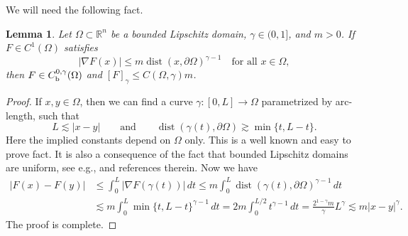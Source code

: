 \documentclass[intlimits,12pt,reqno]{amsart}
\newcommand{\R}{\mathbb R}
\numberwithin{equation}{section}
\def\dist{\operatorname{dist}}
\newtheorem{lemma}[theorem]{Lemma}
\theoremstyle{definition}
\begin{document}
We will need the following fact.
\begin{lemma}
\label{T81}
Let $\Omega\subset\R^n$ be a bounded Lipschitz domain, $\gamma\in (0,1]$, and $m>0$. If $F\in C^1(\Omega)$ satisfies 
$$
|\nabla F(x)|\leq m\dist (x,\partial\Omega)^{\gamma-1}
\quad
\text{for all }
x\in\Omega,
$$
then $F\in C_{\rm b}^{0,\gamma}(\Omega)$ and $[F]_{\gamma}\leq C(\Omega,\gamma)m$.
\end{lemma}
\begin{proof}
If $x,y\in\Omega$, then we can find a curve $\gamma:[0,L]\to\Omega$ parametrized by arc-length, such that
$$
L\lesssim |x-y|
\qquad
\text{and}
\qquad
\dist(\gamma(t),\partial\Omega)\gtrsim\min\{t,L-t\}.
$$
Here the implied constants depend on $\Omega$ only.
This is a well known and easy to prove fact. It is also a consequence of the fact that bounded Lipschitz domains are uniform, see e.g., \cite[p. 225]{HM} and references therein. Now we have
\[
\begin{split}
|F(x)-F(y)|
&\leq
\int_0^L|\nabla F(\gamma(t))|\, dt\leq
m\int_0^L \dist(\gamma(t),\partial\Omega)^{\gamma-1}\, dt\\
&\lesssim
m\int_0^L\min \{ t,L-t\}^{\gamma-1}\, dt=
2m\int_0^{L/2}t^{\gamma-1}\, dt=
\frac{2^{1-\gamma}m}{\gamma} L^\gamma\lesssim m|x-y|^\gamma.
\end{split}
\]
The proof is complete.
\end{proof}
\end{document}

